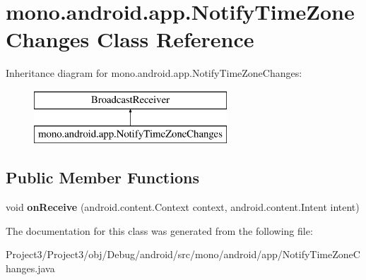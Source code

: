 \hypertarget{classmono_1_1android_1_1app_1_1NotifyTimeZoneChanges}{}\section{mono.\+android.\+app.\+Notify\+Time\+Zone\+Changes Class Reference}
\label{classmono_1_1android_1_1app_1_1NotifyTimeZoneChanges}
Inheritance diagram for mono.\+android.\+app.\+Notify\+Time\+Zone\+Changes\+:\begin{figure}[H]
\begin{center}
\leavevmode
\includegraphics[height=2.000000cm]{classmono_1_1android_1_1app_1_1NotifyTimeZoneChanges}
\end{center}
\end{figure}
\subsection*{Public Member Functions}
\begin{DoxyCompactItemize}
\item 
\mbox{\label{classmono_1_1android_1_1app_1_1NotifyTimeZoneChanges_a07a0e630ae667b83ee774709cc89f20b}} 
void {\bfseries on\+Receive} (android.\+content.\+Context context, android.\+content.\+Intent intent)
\end{DoxyCompactItemize}


The documentation for this class was generated from the following file\+:\begin{DoxyCompactItemize}
\item 
Project3/\+Project3/obj/\+Debug/android/src/mono/android/app/Notify\+Time\+Zone\+Changes.\+java\end{DoxyCompactItemize}
